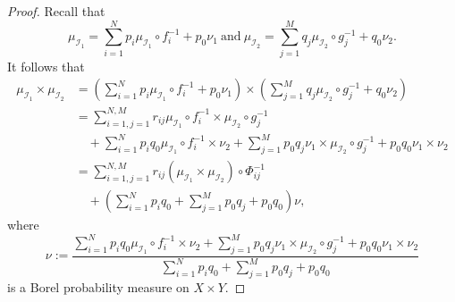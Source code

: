 \documentclass[12pt,oneside,reqno]{amsart}
\theoremstyle{definition}
\theoremstyle{remark}
\begin{document}
\begin{proof}
Recall that
\[
\mu_{\mathcal{I}_1} = \sum_{i=1}^{N} p_i \mu_{\mathcal{I}_1} \circ f_i^{-1} + p_0 \nu_1 ~\text{and}~\mu_{\mathcal{I}_2} = \sum_{j=1}^{M} q_j \mu_{\mathcal{I}_2} \circ g_j^{-1} + q_0 \nu_2.
\]
It follows that
\begin{align*}
\mu_{\mathcal{I}_1} \times \mu_{\mathcal{I}_2} &= \left( \sum_{i=1}^{N} p_i \mu_{\mathcal{I}_1} \circ f_i^{-1} + p_0 \nu_1 \right) \times \left( \sum_{j=1}^{M} q_j \mu_{\mathcal{I}_2} \circ g_j^{-1} + q_0 \nu_2 \right) \\
&= \sum_{i=1,j=1}^{N,M} r_{ij} \mu_{\mathcal{I}_1} \circ f_i^{-1} \times \mu_{\mathcal{I}_2} \circ g_j^{-1} \\
&\quad + \sum_{i=1}^{N} p_i q_0 \mu_{\mathcal{I}_1} \circ f_i^{-1} \times \nu_2 + \sum_{j=1}^{M} p_0 q_j \nu_1 \times \mu_{\mathcal{I}_2} \circ g_j^{-1} + p_0 q_0 \nu_1 \times \nu_2 \\
&= \sum_{i=1,j=1}^{N,M} r_{ij} \left( \mu_{\mathcal{I}_1} \times \mu_{\mathcal{I}_2} \right) \circ \Phi_{ij}^{-1} \\
&\quad + \left( \sum_{i=1}^N p_i q_0 + \sum_{j=1}^M p_0 q_j + p_0 q_0 \right) \nu,
\end{align*}
where
\[
\nu := \frac{
\sum_{i=1}^{N} p_i q_0 \mu_{\mathcal{I}_1} \circ f_i^{-1} \times \nu_2 + \sum_{j=1}^{M} p_0 q_j \nu_1 \times \mu_{\mathcal{I}_2} \circ g_j^{-1} + p_0 q_0 \nu_1 \times \nu_2
}{
\sum_{i=1}^N p_i q_0 + \sum_{j=1}^M p_0 q_j + p_0 q_0
}
\]
is a Borel probability measure on $X \times Y$.
\end{proof}

\end{document}

